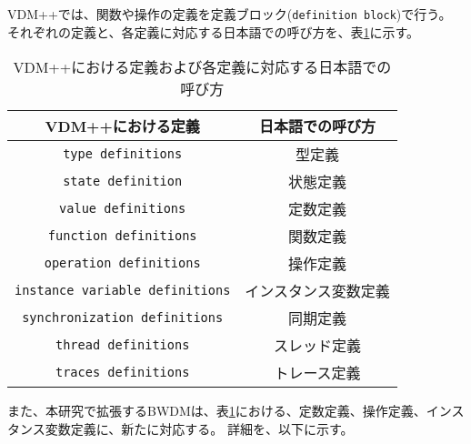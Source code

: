 \documentclass[uplatex, report, a4j, 10pt]{jsbook}
\newcommand\ttt[1]{\texttt{#1}}
\begin{document}
VDM++では、関数や操作の定義を定義ブロック(\ttt{definition block})で行う。
それぞれの定義と、各定義に対応する日本語での呼び方を、表\ref{tab:vdm_definition_japanese}に示す。
\begin{table}[t]
  \begin{center}
    \caption{VDM++における定義および各定義に対応する日本語での呼び方}
    \label{tab:vdm_definition_japanese}
    \begin{tabular}{c|c}
      VDM++における定義                   & 日本語での呼び方     \\
      \hline
      \hline
      \ttt{type definitions}              & 型定義               \\ \hline
      \ttt{state definition}              & 状態定義             \\ \hline
      \ttt{value definitions}             & 定数定義             \\ \hline
      \ttt{function definitions}          & 関数定義             \\ \hline
      \ttt{operation definitions}         & 操作定義             \\ \hline
      \ttt{instance variable definitions} & インスタンス変数定義 \\ \hline
      \ttt{synchronization definitions}   & 同期定義             \\ \hline
      \ttt{thread definitions}            & スレッド定義         \\ \hline
      \ttt{traces definitions}            & トレース定義
    \end{tabular}
  \end{center}
\end{table}

また、本研究で拡張するBWDMは、表\ref{tab:vdm_definition_japanese}における、定数定義、操作定義、インスタンス変数定義に、新たに対応する。
詳細を、以下に示す。
\end{document}
